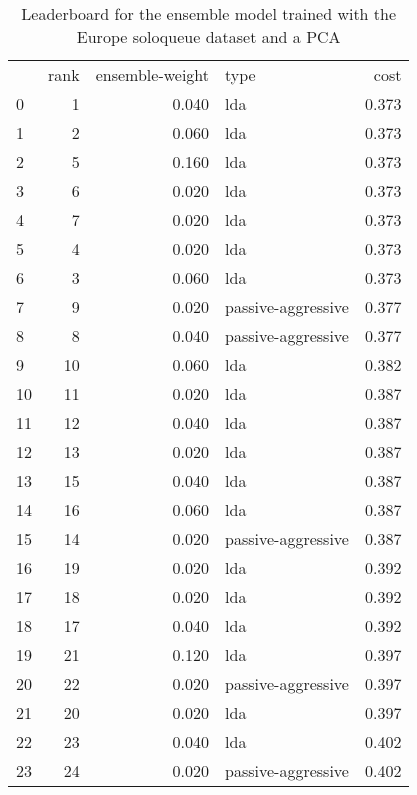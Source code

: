 \begin{table}[]
	\centering
	\begin{tabular}{lrrlr}
		   & rank & ensemble-weight & type               & cost  \\
		0  & 1    & 0.040           & lda                & 0.373 \\
		1  & 2    & 0.060           & lda                & 0.373 \\
		2  & 5    & 0.160           & lda                & 0.373 \\
		3  & 6    & 0.020           & lda                & 0.373 \\
		4  & 7    & 0.020           & lda                & 0.373 \\
		5  & 4    & 0.020           & lda                & 0.373 \\
		6  & 3    & 0.060           & lda                & 0.373 \\
		7  & 9    & 0.020           & passive-aggressive & 0.377 \\
		8  & 8    & 0.040           & passive-aggressive & 0.377 \\
		9  & 10   & 0.060           & lda                & 0.382 \\
		10 & 11   & 0.020           & lda                & 0.387 \\
		11 & 12   & 0.040           & lda                & 0.387 \\
		12 & 13   & 0.020           & lda                & 0.387 \\
		13 & 15   & 0.040           & lda                & 0.387 \\
		14 & 16   & 0.060           & lda                & 0.387 \\
		15 & 14   & 0.020           & passive-aggressive & 0.387 \\
		16 & 19   & 0.020           & lda                & 0.392 \\
		17 & 18   & 0.020           & lda                & 0.392 \\
		18 & 17   & 0.040           & lda                & 0.392 \\
		19 & 21   & 0.120           & lda                & 0.397 \\
		20 & 22   & 0.020           & passive-aggressive & 0.397 \\
		21 & 20   & 0.020           & lda                & 0.397 \\
		22 & 23   & 0.040           & lda                & 0.402 \\
		23 & 24   & 0.020           & passive-aggressive & 0.402 \\
	\end{tabular}

	\caption{Leaderboard for the ensemble model trained with the Europe soloqueue dataset and a PCA}
	\label{tab:lb-europe-games-full-PCA}
\end{table}

